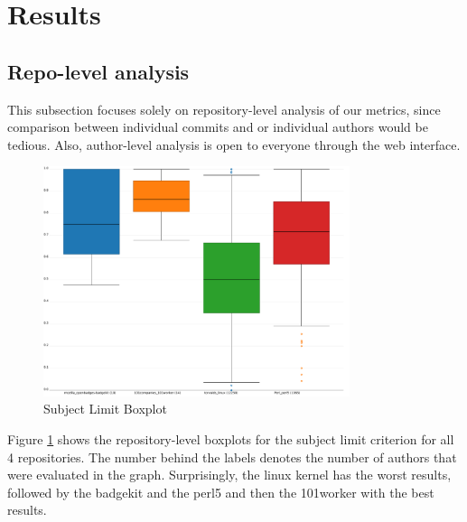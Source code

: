 \section{Results}
\label{sec:results}



\subsection{Repo-level analysis}
\label{sec:results1}


This subsection focuses solely on repository-level analysis of our metrics, since comparison between individual commits and or individual authors would be tedious. Also, author-level analysis is open to everyone through the web interface.

\begin{figure}[p]
    \centering
    \includegraphics[width=0.8\textwidth]{img/subject_limit.pdf}
    \caption{Subject Limit Boxplot}
    \label{fig:bp_subject_limit}
\end{figure}

Figure \ref{fig:bp_subject_limit} shows the repository-level boxplots for the subject limit criterion for all 4 repositories. The number behind the labels denotes the number of authors that were evaluated in the graph. Surprisingly, the linux kernel has the worst results, followed by the badgekit and the perl5 and then the 101worker with the best results.

